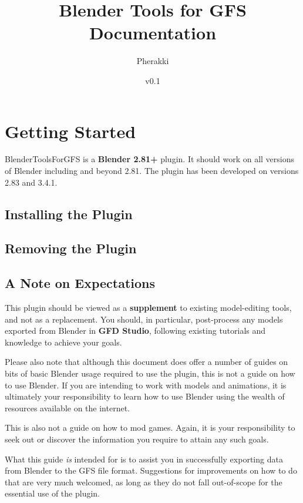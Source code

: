 \documentclass{article}
\title{Blender Tools for GFS Documentation}
\author{Pherakki}
\date{v0.1}
\begin{document}
\maketitle
{}
\clearpage

\tableofcontents
\clearpage


\section{Getting Started}
BlenderToolsForGFS is a \textbf{Blender 2.81+} plugin. It should work on all versions of Blender including and beyond 2.81. The plugin has been developed on versions 2.83 and 3.4.1.

\subsection{Installing the Plugin}


\subsection{Removing the Plugin}

\subsection{A Note on Expectations}
This plugin should be viewed as a \textbf{supplement} to existing model-editing tools, and not as a replacement. You should, in particular, post-process any models exported from Blender in \textbf{GFD Studio}, following existing tutorials and knowledge to achieve your goals.

Please also note that although this document does offer a number of guides on bits of basic Blender usage required to use the plugin, this is not a guide on how to use Blender. If you are intending to work with models and animations, it is ultimately your responsibility to learn how to use Blender using the wealth of resources available on the internet.

This is also not a guide on how to mod games. Again, it is your responsibility to seek out or discover the information you require to attain any such goals.

What this guide \textit{is} intended for is to assist you in successfully exporting data from Blender to the GFS file format. Suggestions for improvements on how to do that are very much welcomed, as long as they do not fall out-of-scope for the essential use of the plugin.
\clearpage
\end{document}
